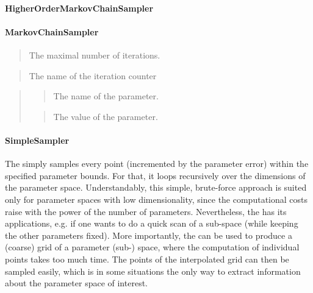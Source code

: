 \documentclass[letterpaper,10pt,english]{sphinxmanual}
\begin{document}
\paragraph{HigherOrderMarkovChainSampler}
\label{higher_order_markov_chain_sampler::doc}\label{higher_order_markov_chain_sampler:higherordermarkovchainsampler}




\paragraph{MarkovChainSampler}
\label{markov_chain_sampler::doc}\label{markov_chain_sampler:markovchainsampler}


\begin{quote}

The maximal number of iterations.
\end{quote}


\begin{quote}

The name of the iteration counter
\end{quote}

\begin{quote}

\begin{quote}

The name of the parameter.
\end{quote}

\begin{quote}

The value of the parameter.
\end{quote}
\end{quote}


\paragraph{SimpleSampler}
\label{simple_sampler::doc}\label{simple_sampler:simplesampler}
The  simply samples every point (incremented by the parameter error) within the
specified parameter bounds. For that, it loops recursively over the dimensions of the parameter
space. Understandably, this simple, brute-force approach is suited only for parameter spaces with
low dimensionality, since the computational costs raise with the power of the number of parameters.
Nevertheless, the  has its applications, e.g. if one wants to do a quick scan of a
sub-space (while keeping the other parameters fixed). More importantly, the  can be
used to produce a (coarse) grid of a parameter (sub-) space, where the computation of individual
points takes too much time. The points of the interpolated grid can then be sampled easily, which is
in some situations the only way to extract information about the parameter space of interest.
\end{document}
